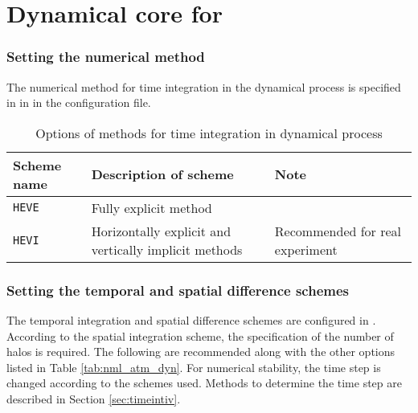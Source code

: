\section{Dynamical core for \scalerm} \label{sec:atmos_dyn}

\subsubsection{Setting the numerical method}  %
The numerical method for time integration in the dynamical process is specified in  in  in the configuration file.

\begin{table}[bth]
\begin{center}
  \caption{Options of methods for time integration in dynamical process}
  \label{tab:nml_dyn}
  \begin{tabularx}{150mm}{llX} \hline
    \rowcolor[gray]{0.9}  Scheme name & Description of scheme & Note\\ \hline
      \verb|HEVE|  & Fully explicit method & \\
      \verb|HEVI|  & Horizontally explicit and vertically implicit methods & Recommended for real experiment\\
    \hline
  \end{tabularx}
\end{center}
\end{table}


\subsubsection{Setting the temporal and spatial difference schemes} \label{subsec:atmos_dyn_scheme}

The temporal integration and spatial difference schemes are configured in . According to the spatial integration scheme, the specification of the number of halos is required. The following are recommended along with the other options listed in Table \ref{tab:nml_atm_dyn}. For numerical stability, the time step is changed according to the schemes used. Methods to determine the time step are described in Section \ref{sec:timeintiv}.

